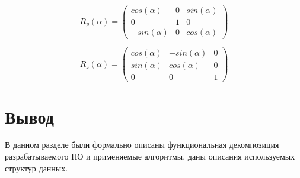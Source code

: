 \begin{equation}\label{eq:matrix_rotate_y}
	R_y(\alpha) = \begin{pmatrix}
		cos(\alpha) & 0 & sin(\alpha) \\
		0 & 1 & 0 \\
		-sin(\alpha) & 0 & cos(\alpha)
	\end{pmatrix}
\end{equation}

\begin{equation}\label{eq:matrix_rotate_z}
	R_z(\alpha) = \begin{pmatrix}
		cos(\alpha) & -sin(\alpha) & 0 \\
		sin(\alpha) & cos(\alpha) & 0 \\
		0 & 0 & 1
	\end{pmatrix}
\end{equation}

\section*{Вывод}

В данном разделе были формально описаны функциональная декомпозиция разрабатываемого ПО и применяемые алгоритмы, даны описания используемых структур данных.